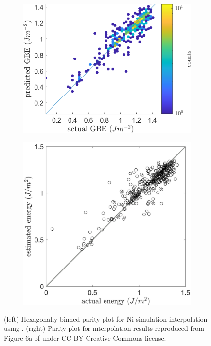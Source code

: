 \documentclass[preprint,12pt]{elsarticle}
\begin{document}
\begin{figure}
     \centering
     \begin{subfigure}[b]{0.5\textwidth}
         \centering
         \includegraphics[width=\textwidth]{figures/olmsted-Ni-loocv.png}
         \label{fig:our-loocv}
     \hfill
     \end{subfigure}
          \begin{subfigure}[b]{0.4\textwidth}
         \centering
         \includegraphics[width=\textwidth]{figures/ChesserFigure.jpg}
         \label{fig:chesser-loocv}
     \end{subfigure}
        \caption{(left) Hexagonally binned parity plot for Ni simulation  interpolation using . (right) Parity plot for  interpolation results reproduced from Figure 6a of \citet{chesserLearningGrainBoundary2020} under CC-BY Creative Commons license. }
        \label{fig:olmsted-Ni-loocv}
\end{figure}
\end{document}
